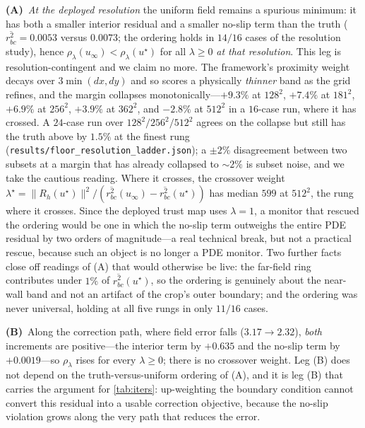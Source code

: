 \textbf{(A)}~\emph{At the deployed resolution} the uniform field remains a spurious
minimum: it has both a smaller interior residual and a smaller no-slip term than the truth
($\overline{r_{bc}^2}=0.0053$ versus $0.0073$; the ordering holds in $14/16$ cases of the
resolution study), hence $\rho_\lambda(u_\infty)<\rho_\lambda(u^\star)$ for all
$\lambda\ge0$ \emph{at that resolution}. This leg is resolution-contingent and we claim no
more. The framework's proximity weight decays over $3\min(dx,dy)$ and so
scores a physically \emph{thinner} band as the grid refines, and the margin collapses
monotonically---$+9.3\%$ at $128^2$, $+7.4\%$ at $181^2$, $+6.9\%$ at $256^2$, $+3.9\%$ at
$362^2$, and $-2.8\%$ at $512^2$ in a $16$-case run, where it has crossed. A $24$-case run
over $128^2/256^2/512^2$ agrees on the collapse but still has the truth above by $1.5\%$ at
the finest rung (\texttt{results/floor\_resolution\_ladder.json}); a ${\pm}2\%$ disagreement
between two subsets at a margin that has already collapsed to ${\sim}2\%$ is subset noise,
and we take the cautious reading. Where it crosses, the crossover
weight
$\lambda^\star=\|R_h(u^\star)\|^2/(\overline{r_{bc}^2}(u_\infty)-\overline{r_{bc}^2}(u^\star))$
has median $599$ at $512^2$, the rung where it crosses. Since the deployed trust map uses
$\lambda=1$, a monitor that rescued the ordering would be one in which the no-slip term
outweighs the entire PDE residual by two orders of magnitude---a real technical break, but
not a practical rescue, because such an object is no longer a PDE monitor. Two further
facts close off readings of (A) that would otherwise be live: the far-field ring
contributes under $1\%$ of $\overline{r_{bc}^2}(u^\star)$, so the ordering is genuinely
about the near-wall band and not an artifact of the crop's outer boundary; and the
ordering was never universal, holding at all five rungs in only $11/16$ cases.

\textbf{(B)}~Along the correction path, where field error falls ($3.17\!\to\!2.32$),
\emph{both} increments are positive---the interior term by $+0.635$ and the no-slip term by
$+0.0019$---so $\rho_\lambda$ rises for every $\lambda\ge0$; there is no crossover weight.
Leg (B) does not depend on the truth-versus-uniform ordering of (A), and it is leg (B) that
carries the argument for \autoref{tab:iters}: up-weighting the boundary condition cannot
convert this residual into a usable correction objective, because the no-slip violation
grows along the very path that reduces the error.


